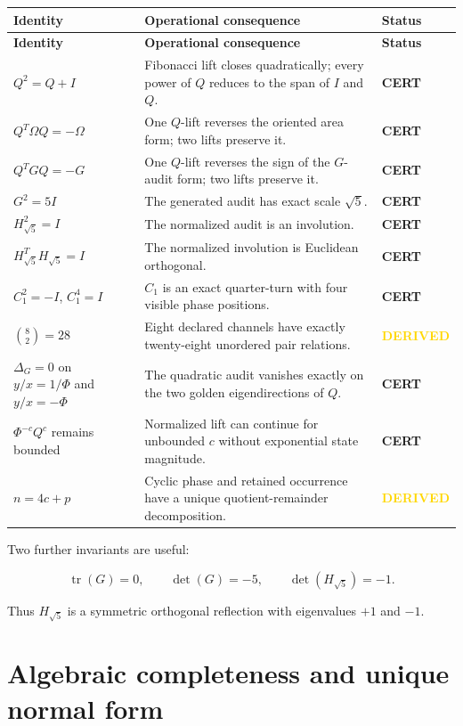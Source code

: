 \documentclass[11pt,letterpaper]{article}
\theoremstyle{clearonyx}
\newcommand{\tr}{\operatorname{tr}}
\newcommand{\statuscert}{\textcolor{certgreen}{\textbf{CERT}}}
\newcommand{\statusderived}{\textcolor{gold}{\textbf{DERIVED}}}
\begin{document}
\begin{longtable}{@{}p{}p{}p{}@{}}
\toprule
\textbf{Identity} & \textbf{Operational consequence} & \textbf{Status}\\
\midrule
\endfirsthead
\toprule
\textbf{Identity} & \textbf{Operational consequence} & \textbf{Status}\\
\midrule
\endhead
$Q^2=Q+I$ & Fibonacci lift closes quadratically; every power of $Q$ reduces to the span of $I$ and $Q$. & \statuscert\\
$Q^T\Omega Q=-\Omega$ & One $Q$-lift reverses the oriented area form; two lifts preserve it. & \statuscert\\
$Q^TGQ=-G$ & One $Q$-lift reverses the sign of the $G$-audit form; two lifts preserve it. & \statuscert\\
$G^2=5I$ & The generated audit has exact scale $\sqrt5$. & \statuscert\\
$H_{\sqrt5}^2=I$ & The normalized audit is an involution. & \statuscert\\
$H_{\sqrt5}^{T}H_{\sqrt5}=I$ & The normalized involution is Euclidean orthogonal. & \statuscert\\
$C_1^2=-I$, $C_1^4=I$ & $C_1$ is an exact quarter-turn with four visible phase positions. & \statuscert\\
$\binom82=28$ & Eight declared channels have exactly twenty-eight unordered pair relations. & \statusderived\\
$\Delta_G=0$ on $y/x=1/\Phi$ and $y/x=-\Phi$ & The quadratic audit vanishes exactly on the two golden eigendirections of $Q$. & \statuscert\\
$\Phi^{-c}Q^c$ remains bounded & Normalized lift can continue for unbounded $c$ without exponential state magnitude. & \statuscert\\
$n=4c+p$ & Cyclic phase and retained occurrence have a unique quotient-remainder decomposition. & \statusderived\\
\bottomrule
\end{longtable}

Two further invariants are useful:

\begin{equation}
\tr(G)=0,
\qquad
\det(G)=-5,
\qquad
\det(H_{\sqrt5})=-1.
\end{equation}

Thus $H_{\sqrt5}$ is a symmetric orthogonal reflection with eigenvalues $+1$ and $-1$.

\section{Algebraic completeness and unique normal form}
\end{document}
